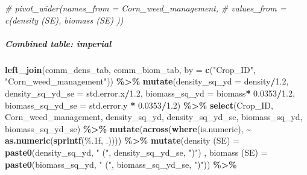 \documentclass[
]{article}
\newenvironment{Shaded}{\begin{snugshade}}{\end{snugshade}}
\newcommand{\AttributeTok}[1]{\textcolor[rgb]{0.13,0.29,0.53}{#1}}
\newcommand{\CommentTok}[1]{\textcolor[rgb]{0.56,0.35,0.01}{\textit{#1}}}
\newcommand{\FloatTok}[1]{\textcolor[rgb]{0.00,0.00,0.81}{#1}}
\newcommand{\FunctionTok}[1]{\textcolor[rgb]{0.13,0.29,0.53}{\textbf{#1}}}
\newcommand{\NormalTok}[1]{#1}
\newcommand{\OtherTok}[1]{\textcolor[rgb]{0.56,0.35,0.01}{#1}}
\newcommand{\SpecialCharTok}[1]{\textcolor[rgb]{0.81,0.36,0.00}{\textbf{#1}}}
\newcommand{\StringTok}[1]{\textcolor[rgb]{0.31,0.60,0.02}{#1}}
\begin{document}
\begin{Shaded}
\begin{Highlighting}[]
  \CommentTok{\# pivot\_wider(names\_from = Corn\_weed\_management,}
  \CommentTok{\#             values\_from = c(\textasciigrave{}density (SE)\textasciigrave{},  \textasciigrave{}biomass (SE)\textasciigrave{} ))}
\end{Highlighting}
\end{Shaded}

\subparagraph{Combined table: imperial}\label{combined-table-imperial}

\begin{Shaded}
\begin{Highlighting}[]
\FunctionTok{left\_join}\NormalTok{(comm\_dens\_tab, comm\_biom\_tab, }\AttributeTok{by =} \FunctionTok{c}\NormalTok{(}\StringTok{"Crop\_ID"}\NormalTok{, }\StringTok{"Corn\_weed\_management"}\NormalTok{)) }\SpecialCharTok{\%\textgreater{}\%}
  \FunctionTok{mutate}\NormalTok{(}\AttributeTok{density\_sq\_yd =}\NormalTok{ density}\SpecialCharTok{/}\FloatTok{1.2}\NormalTok{,}
         \AttributeTok{density\_sq\_yd\_se =}\NormalTok{ std.error.x}\SpecialCharTok{/}\FloatTok{1.2}\NormalTok{,}
         \AttributeTok{biomass\_sq\_yd =}\NormalTok{ biomass}\SpecialCharTok{*} \FloatTok{0.0353}\SpecialCharTok{/}\FloatTok{1.2}\NormalTok{,}
         \AttributeTok{biomass\_sq\_yd\_se =}\NormalTok{ std.error.y }\SpecialCharTok{*} \FloatTok{0.0353}\SpecialCharTok{/}\FloatTok{1.2}\NormalTok{) }\SpecialCharTok{\%\textgreater{}\%}
  \FunctionTok{select}\NormalTok{(Crop\_ID, Corn\_weed\_management,}
\NormalTok{         density\_sq\_yd, density\_sq\_yd\_se,}
\NormalTok{         biomass\_sq\_yd, biomass\_sq\_yd\_se) }\SpecialCharTok{\%\textgreater{}\%}
  \FunctionTok{mutate}\NormalTok{(}\FunctionTok{across}\NormalTok{(}\FunctionTok{where}\NormalTok{(is.numeric), }\SpecialCharTok{\textasciitilde{}} \FunctionTok{as.numeric}\NormalTok{(}\FunctionTok{sprintf}\NormalTok{(}\StringTok{\textquotesingle{}\%.1f\textquotesingle{}}\NormalTok{, .)))) }\SpecialCharTok{\%\textgreater{}\%}
  \FunctionTok{mutate}\NormalTok{(}\StringTok{\textasciigrave{}}\AttributeTok{density (SE)}\StringTok{\textasciigrave{}} \OtherTok{=} \FunctionTok{paste0}\NormalTok{(density\_sq\_yd, }\StringTok{" ("}\NormalTok{, density\_sq\_yd\_se, }\StringTok{")"}\NormalTok{) ,}
         \StringTok{\textasciigrave{}}\AttributeTok{biomass (SE)}\StringTok{\textasciigrave{}} \OtherTok{=} \FunctionTok{paste0}\NormalTok{(biomass\_sq\_yd, }\StringTok{" ("}\NormalTok{, biomass\_sq\_yd\_se, }\StringTok{")"}\NormalTok{)) }\SpecialCharTok{\%\textgreater{}\%}

\end{Highlighting}
\end{Shaded}
\end{document}
